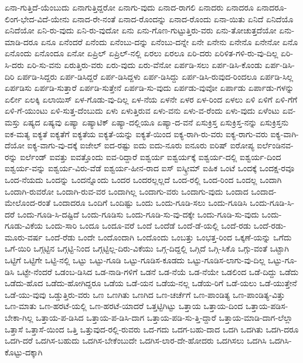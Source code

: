 {ಏನಾ-ಗುತ್ತಿದೆ-ಯೆಂಬುದು
ಏನಾಗುತ್ತಿದ್ದರೋ
ಏನಾಗು-ವುದು
ಏನಾದ-ರಾಗಲಿ
ಏನಾದರು
ಏನಾದರೂ
ಏನಾದರೂ-ಲಿಂಗ-ಭೇದ-ವಿದೆ-ಯೇನು
ಏನಾದ-ರೇ-ನಂತೆ
ಏನಾದ-ರೊಂದನ್ನು
ಏನಾದ-ರೊಂದು
ಏನಾ-ಯಿತು
ಏನಿದೆ
ಏನಿದೆಯೊ
ಏನಿದೆಯೋ
ಏನಿ-ರು-ವುದು
ಏನಿ-ರು-ವುದೋ
ಏನು
ಏನು-ಗೊಣ-ಗುಟ್ಟುತ್ತಿರು-ವರು
ಏನು-ತೋಚುತ್ತದೆಯೋ
ಏನು-ಮಾಡಿ-ದರೂ
ಏನೂ
ಏನೆಂದರೆ
ಏನೆಂದು
ಏನೆಂಬು-ದನ್ನು
ಏನೆಂಬು-ದನ್ನೇ
ಏನೇ
ಏನೇನು
ಏನೇನೊ
ಏನೇನೋ
ಏನೊ
ಏನೊಂದು
ಏನೊಂದೂ
ಏನೋ
ಏಪ್ರಿಲ್
ಏಪ್ರಿಲ್-ನಲ್ಲಿ
ಏರಲು
ಏರಲೂ
ಏರಿ-ದರು
ಏರಿಳಿತ-ಗಳಿ-ರು-ವು-ದಿಲ್ಲ
ಏರಿ-ಸಿ-ದರು
ಏರಿ-ಸು-ವನು
ಏರುತ್ತಿರು-ವರು
ಏರು-ವುದು
ಏರು-ವೆನೋ
ಏರ್ಪಡಿ-ಸಲು
ಏರ್ಪ-ಡಿಸಿ-ಕೊಂಡು
ಏರ್ಪ-ಡಿಸಿ-ದಿರಿ
ಏರ್ಪಡಿ-ಸಿದ್ದರು
ಏರ್ಪ-ಡಿಸಿದ್ದರೆ
ಏರ್ಪ-ಡಿಸಿದ್ದಳು
ಏರ್ಪ-ಡಿಸಿದ್ದು
ಏರ್ಪ-ಡಿಸಿ-ರುವುದ-ರಿಂದಲೂ
ಏರ್ಪಡಿ-ಸಿಲ್ಲ
ಏರ್ಪಡಿಸು
ಏರ್ಪಡಿ-ಸುತ್ತಾರೆ
ಏರ್ಪಡಿ-ಸುತ್ತೇನೆ
ಏರ್ಪಡಿ-ಸು-ವುದು
ಏರ್ಪಡು-ವುವೋ
ಏರ್ಪಾಡು
ಏರ್ಪಾಡು-ಗಳನ್ನು
ಏರ್ಲೀ
ಏಲಕ್ಕಿ
ಏಲಾಯಿಸ್
ಏಳ-ಗೊಡು-ವು-ದಿಲ್ಲ
ಏಳ-ನೆಯ
ಏಳನೇ
ಏಳರ
ಏಳ-ರಿಂದ
ಏಳಲು
ಏಳಿ
ಏಳಿಗೆ
ಏಳಿ-ಗೆಗೆ
ಏಳಿ-ಗೆ-ಯುಂಟು
ಏಳಿ-ಸುತ್ತ-ದೆಂಬುದು
ಏಳು
ಏಳುತ್ತಿರುವ
ಏಳು-ವನು
ಏಳು-ವ-ರೆಂದು
ಏಳು-ವುದು
ಏಳೆಂಟು
ಏವ-ಮಸ್ತು
ಏಷ್ಯದ
ಏಷ್ಯವು
ಏಷ್ಯಾ
ಏಷ್ಯಾಟಿಕ್
ಏಷ್ಯಾ-ದಲ್ಲಿಯೂ
ಏಷ್ಯಾ-ದ-ವನೆ
ಏಸುಕ್ರಿಸ್ತ
ಏಸುಕ್ರಿಸ್ತ-ನನ್ನು
ಏಸುಕ್ರಿಸ್ತನು
ಐಕ-ಮತ್ಯ
ಐಕ್ಯತೆ
ಐಕ್ಯತೆಗೆ
ಐಕ್ಯತೆಯ
ಐಕ್ಯತೆ-ಯನ್ನು
ಐಕ್ಯತೆ-ಯಿಂದ
ಐಕ್ಯ-ರಾಗಿ-ರು-ವರು
ಐಕ್ಯ-ರಾಗು-ವರು
ಐಕ್ಯ-ವಾಗಿ-ದೆಯೋ
ಐಕ್ಯ-ವಾಗು-ವು-ದಕ್ಕೆ
ಐಜೇಲ್
ಐದ-ರಷ್ಟು
ಐದು
ಐದು-ನೂರು
ಐನೂರು
ಐರಿಷ್
ಐರೋಪ್ಯ
ಐರ್ಲೆಂಡಿನವ-ರನ್ನು
ಐರ್ಲೆಂಡ್
ಐವತ್ತು
ಐವತ್ತೊಂದು
ಐವ-ರಿದ್ದಾರೆ
ಐಶ್ವರ್ಯ
ಐಶ್ವರ್ಯಕ್ಕೆ
ಐಶ್ವರ್ಯ-ದಲ್ಲಿ
ಐಶ್ವರ್ಯ-ದಿಂದ
ಐಶ್ವರ್ಯ-ವನ್ನು
ಐಶ್ವರ್ಯ-ವಿರು-ವೆಡೆ
ಐಶ್ವರ್ಯ-ಹೀನ-ರಾದ
ಐಸ್
ಐಸ್ಕ್ರೀಮ್
ಐಹಿಕ
ಒಂಟೆ
ಒಂದಕ್ಕೆ
ಒಂದಕ್ಷ-ರವೂ
ಒಂದ-ನೆಯದು
ಒಂದನ್ನು
ಒಂದನ್ನೊಂದು
ಒಂದರ
ಒಂದರಲ್ಲಲ್ಲದೆ
ಒಂದ-ರಲ್ಲಿ
ಒಂದ-ರಿಂದ
ಒಂದಲ್ಲ
ಒಂದಾಗಿ
ಒಂದಾಗಿ-ರುವರೋ
ಒಂದಾಗಿ-ರುವ-ವರ
ಒಂದಾಗಿಲ್ಲ
ಒಂದಾಗು-ವರು
ಒಂದಾಗು-ವುದು
ಒಂದಾದ
ಒಂದಾದ-ಮೇಲೊಂದ-ರಂತೆ
ಒಂದಾದರೂ
ಒಂದಿಗೆ
ಒಂದಿಷ್ಟು
ಒಂದು
ಒಂದು-ಗೂಡಿ-ಸಲು
ಒಂದು-ಗೂಡಿಸಿ
ಒಂದು-ಗೂಡಿ-ಸಿ-ದರೆ
ಒಂದು-ಗೂಡಿ-ಸಿ-ದಷ್ಟಿದೆ
ಒಂದು-ಗೂಡಿಸು
ಒಂದು-ಗೂಡಿ-ಸು-ವು-ದಕ್ಕೇ
ಒಂದು-ಗೂಡಿ-ಸು-ವುದು
ಒಂದು-ಗೂಡು-ವಿಕೆಯ
ಒಂದು-ಸಾರಿ
ಒಂದೂ
ಒಂದೂ-ವರೆ
ಒಂದೆ
ಒಂದೆಡೆ
ಒಂದೆ-ಡೆ-ಯಲ್ಲಿ
ಒಂದೆ-ರಡು
ಒಂದೆ-ರಡು-ಮೂರು-ವರ್ಷ
ಒಂದೆ-ರೆಡು
ಒಂದೇ
ಒಂದೊಂದಾಗಿ
ಒಂದೊಂದು
ಒಂಬತ್ತು
ಒಂಭತ್ತ-ರಿಂದ
ಒಕ್ಕಣೆ-ಯನ್ನು
ಒಗೆದು
ಒಗೆ-ಯಿರಿ
ಒಗ್ಗಟ್ಟಿನ
ಒಗ್ಗಟ್ಟಿ-ನಿಂದ
ಒಗ್ಗಟ್ಟಿಲ್ಲ-ದಿರು-ವಿಕೆಯು
ಒಗ್ಗ-ದಿದ್ದಲ್ಲಿ
ಒಗ್ಗಿದೆ
ಒಗ್ಗಿ-ಸಿಕೊ
ಒಗ್ಗು-ವಂತೆ
ಒಟ್ಟಾಗಿ
ಒಟ್ಟಿಗೆ
ಒಟ್ಟಿಗೇ
ಒಟ್ಟಿ-ನಲ್ಲಿ
ಒಟ್ಟು
ಒಟ್ಟು-ಗೂಡಿ
ಒಟ್ಟು-ಗೂಡಿಸ-ಕೂಡದು
ಒಟ್ಟು-ಗೂಡಿಸ-ಲಾಗು-ವು-ದಿಲ್ಲ
ಒಟ್ಟು-ಗೂ-ಡಿಸಿ
ಒಟ್ಟೇ-ನೆಂದರೆ
ಒಡಂಬ-ಡಿಸಿದ
ಒಡ-ನಾಡಿ-ಗಳಿಗೆ
ಒಡನೆ
ಒಡ-ನೆಯೆ
ಒಡ-ನೆಯೇ
ಒಡಲಿಂದ
ಒಡೆ-ದಿದ್ದು
ಒಡೆದು
ಒಡೆದು-ಹೊದ
ಒಡೆದು-ಹೋಗಿದ್ದರೂ
ಒಡೆಯ
ಒಡೆ-ಯನ
ಒಡೆಯ-ನಲ್ಲ
ಒಡೆಯ-ರಿಗೆ
ಒಡೆ-ಯಲು
ಒಡೆ-ಯುತ್ತೇನೆ
ಒಡೆ-ಯು-ವುವು
ಒಡ್ಡುತ್ತಿರು-ವರು
ಒಣ
ಒಣಗಿತು
ಒಣಗಿದ
ಒಣ-ಚರ್ಚೆಗೆ
ಒಣ-ಪಾಂಡಿತ್ಯ
ಒಣ-ಪಾಂಡಿತ್ಯ-ವಿತ್ತು
ಒಣ-ಮಾತು
ಒಣ-ಹರಟೆ-ಯಲ್ಲಿ
ಒಣ-ಹರಟೆ-ಯಾದರೆ
ಒತ್ತಟ್ಟಿಗಿಟ್ಟು
ಒತ್ತಾಯ
ಒತ್ತಾಯ-ದಿಂದ
ಒತ್ತಾಯ-ಪಡಿಸ-ಬೇಕಾ-ಗಿಲ್ಲ
ಒತ್ತಾಯ-ಪ-ಡಿಸಿದ
ಒತ್ತಾಯ-ಪ-ಡಿಸಿ-ದಾಗ
ಒತ್ತಾಯ-ಪಡಿ-ಸು-ತ್ತಿ-ದ್ದಾರೆ
ಒತ್ತಾಯ-ಮಾಡಿ-ದಾಗ-ಲೆಲ್ಲಾ
ಒತ್ತಾಸೆ
ಒತ್ತಾಸೆ-ಯಿಂದ
ಒತ್ತಿ
ಒತ್ತುವುದ-ರಲ್ಲಿ-ರುವರು
ಒದ-ಗದು
ಒದಗ-ಬಹು-ದಾದ
ಒದಗಿ
ಒದಗಿತು
ಒದಗಿ-ದರೂ
ಒದಗಿ-ದರೆ
ಒದಗಿಸ-ಬಹುದು
ಒದಗಿಸ-ಬೇಕೆಂಬುದೇ
ಒದಗಿಸ-ಲಾರ-ದೇ-ಹೋದರು
ಒದಗಿಸಲು
ಒದಗಿಸಿ
ಒದಗಿಸಿ-ಕೊಟ್ಟು-ದಕ್ಕಾಗಿ
}
